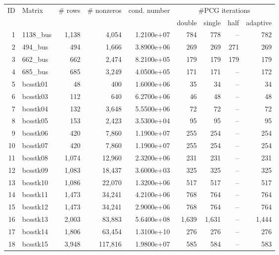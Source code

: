 \begin{table}[p]
\begin{center}
\scriptsize
\begin{tabular}{rlrrr||rrrr}
\hline
\hline

\hline
ID & Matrix & \# rows & \# nonzeros & cond. number & \multicolumn{4}{c}{\#PCG 
iterations}\\
& & & & & double & single & half & adaptive\\
\hline
1 &  1138\_bus & 1,138 &     4,054 & 1.2100e+07 & 784 &  778 &  -- &  782 \\
  2 &   494\_bus &  494 &     1,666 & 3.8900e+06 & 269 &  269 &  271 &  269 \\
  3 &   662\_bus &  662 &     2,474 & 8.2100e+05 & 179 &  179 &  179 &  179 \\
  4 &   685\_bus &  685 &     3,249 & 4.0500e+05 & 171 &  171 &  -- &  172 \\
  5 &   bcsstk01 &   48 &      400 & 1.6000e+06 &  35 &   34 &  -- &   34 \\
  6 &   bcsstk03 &  112 &      640 & 6.2700e+06 &  46 &   48 &  -- &   48 \\
  7 &   bcsstk04 &  132 &     3,648 & 5.5500e+06 &  72 &   72 &  -- &   72 \\
  8 &   bcsstk05 &  153 &     2,423 & 3.5300e+04 &  95 &   95 &  -- &   95 \\
  9 &   bcsstk06 &  420 &     7,860 & 1.1900e+07 & 255 &  254 &  -- &  254 \\
 10 &   bcsstk07 &  420 &     7,860 & 1.1900e+07 & 255 &  254 &  -- &  254 \\
 11 &   bcsstk08 & 1,074 &    12,960 & 2.3200e+06 & 231 &  231 &  -- &  231 \\
 12 &   bcsstk09 & 1,083 &    18,437 & 3.6000e+03 & 325 &  325 &  -- &  325 \\
 13 &   bcsstk10 & 1,086 &    22,070 & 1.3200e+06 & 517 &  517 &  -- &  517 \\
 14 &   bcsstk11 & 1,473 &    34,241 & 4.2100e+06 & 768 &  764 &  -- &  764 \\
 15 &   bcsstk12 & 1,473 &    34,241 & 2.9000e+06 & 768 &  764 &  -- &  764 \\
 16 &   bcsstk13 & 2,003 &    83,883 & 5.6400e+08 &1,639 & 1,631 &  -- & 1,444 
 \\
 17 &   bcsstk14 & 1,806 &    63,454 & 1.3100e+10 & 276 &  276 &  -- &  276 \\
 18 &   bcsstk15 & 3,948 &   117,816 & 1.9800e+07 & 585 &  584 &  -- &  583 \\

\end{tabular}
\end{center}
\end{table}
